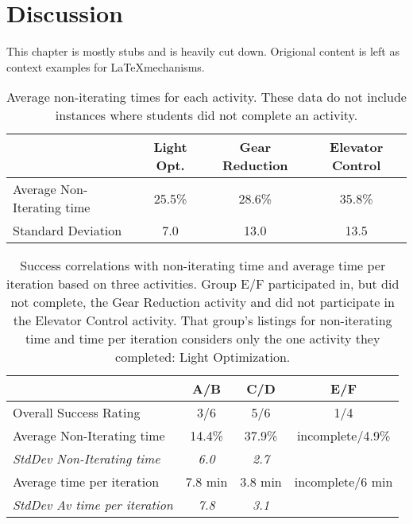 \chapter{Discussion}

This chapter is mostly stubs and is heavily cut down. Origional content is left as context examples for \LaTeX mechanisms.

\begin{table}
\begin{centering}
\begin{tabular}{l c c c}
	\toprule
							& Light Opt.	& Gear Reduction	& Elevator Control	\\ \midrule
	Average Non-Iterating time 	& 25.5\%	& 28.6\%	& 35.8\% 	\\ \midrule
	Standard Deviation 			& 7.0 & 13.0 & 13.5 \\ 
	\bottomrule
\end{tabular}
\caption[Average non-iterating times for each activity.]{Average non-iterating times for each activity. These data do not include instances where students did not complete an activity.}
\label{tab:average-intro-times}
\end{centering}
\end{table}

\begin{table}
\begin{centering}
\begin{tabular}{l c c c}
	\toprule
							& A/B 	& C/D	& E/F	\\ \midrule
	Overall Success Rating          	& 3/6		& 5/6 		& 1/4		\\ \midrule
	Average Non-Iterating time 	& 14.4\%	& 37.9\%	& incomplete/4.9\% 	\\ \midrule
	\emph{StdDev Non-Iterating time}	& \emph{6.0}	& \emph{2.7}	& 					\\ \midrule
	Average time per iteration 	& 7.8 min & 3.8 min & incomplete/6 min \\ \midrule
	\emph{StdDev Av time per iteration}	& \emph{7.8}	& \emph{3.1}	& 					\\ 
	\bottomrule
\end{tabular}
\caption[Correlations of success to iteration time.]{Success correlations with non-iterating time and average time per iteration based on three activities. Group E/F participated in, but did not complete, the Gear Reduction activity and did not participate in the Elevator Control activity. That group's listings for non-iterating time and time per iteration considers only the one activity they completed: Light Optimization. }
\label{tab:success-correlations}
\end{centering}
\end{table}

